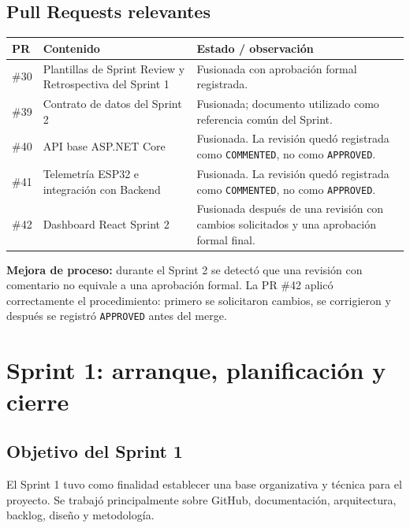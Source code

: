 \documentclass[11pt,a4paper,oneside]{report}
\begin{document}
\section{Pull Requests relevantes}

\begin{longtable}{@{}p{1.4cm}p{5.3cm}p{5.3cm}@{}}
\toprule
\textbf{PR} & \textbf{Contenido} & \textbf{Estado / observación} \\
\midrule
\endhead
\#30 & Plantillas de Sprint Review y Retrospectiva del Sprint 1 & Fusionada con aprobación formal registrada. \\
\#39 & Contrato de datos del Sprint 2 & Fusionada; documento utilizado como referencia común del Sprint. \\
\#40 & API base ASP.NET Core & Fusionada. La revisión quedó registrada como \texttt{COMMENTED}, no como \texttt{APPROVED}. \\
\#41 & Telemetría ESP32 e integración con Backend & Fusionada. La revisión quedó registrada como \texttt{COMMENTED}, no como \texttt{APPROVED}. \\
\#42 & Dashboard React Sprint 2 & Fusionada después de una revisión con cambios solicitados y una aprobación formal final. \\
\bottomrule
\end{longtable}

\textbf{Mejora de proceso:} durante el Sprint 2 se detectó que una revisión con comentario no equivale a una aprobación formal. La PR \#42 aplicó correctamente el procedimiento: primero se solicitaron cambios, se corrigieron y después se registró \texttt{APPROVED} antes del merge.


\chapter{Sprint 1: arranque, planificación y cierre}

\section{Objetivo del Sprint 1}

El Sprint 1 tuvo como finalidad establecer una base organizativa y técnica para el proyecto. Se trabajó principalmente sobre GitHub, documentación, arquitectura, backlog, diseño y metodología.
\end{document}
